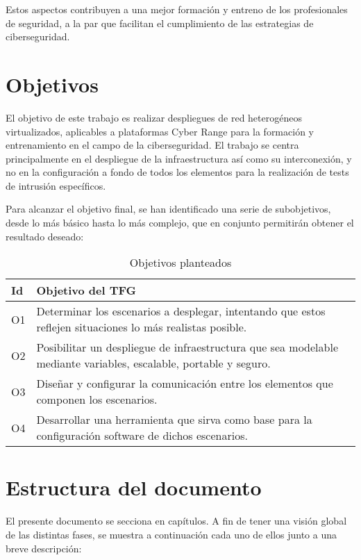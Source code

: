   Estos aspectos contribuyen a una mejor formación y entreno de los profesionales de seguridad, a la par que facilitan el cumplimiento de las estrategias de ciberseguridad.

\section{Objetivos} \label{sec:obj}
  El objetivo de este trabajo es realizar despliegues de red heterogéneos virtualizados, aplicables a plataformas Cyber Range para la formación y entrenamiento en el campo de la ciberseguridad. El trabajo se centra principalmente en el despliegue de la infraestructura así como su interconexión, y no en la configuración a fondo de todos los elementos para la realización de tests de intrusión específicos.

  Para alcanzar el objetivo final, se han identificado una serie de subobjetivos, desde lo más básico hasta lo más complejo, que en conjunto permitirán obtener el resultado deseado:

  \begin{table}[h]
    \begin{center}
      \begin{tabular}{ | w{c}{1cm} | m{14cm} | }
        \hline{} \textbf{Id} & \textbf{Objetivo del TFG} \\ \hline
        O1 & Determinar los escenarios a desplegar, intentando que estos reflejen situaciones lo más realistas posible. \\ \hline{}
        O2 & Posibilitar un despliegue de infraestructura que sea modelable mediante variables, escalable, portable y seguro. \\ \hline
        O3 & Diseñar y configurar la comunicación entre los elementos que componen los escenarios. \\ \hline{}
        O4 & Desarrollar una herramienta que sirva como base para la configuración software de dichos escenarios. \\ \hline
      \end{tabular}
      \caption{Objetivos planteados}
      \label{tab:objs}
    \end{center}
  \end{table}

\section{Estructura del documento} \label{sec:est}
  El presente documento se secciona en capítulos. A fin de tener una visión global de las distintas fases, se muestra a continuación cada uno de ellos junto a una breve descripción:

